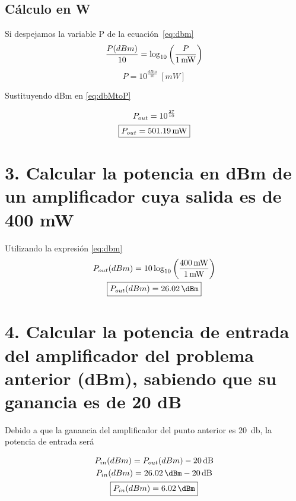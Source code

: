 \documentclass[11pt,a4paper]{article}
\begin{document}
\newpage
\subsection*{Cálculo en W}
Si despejamos la variable P de la ecuación~\eqref{eq:dbm}
\[
        \frac{P(dBm)}{10} = \log_{10} \left(\frac{P}{\SI{1}{\milli\watt}}\right)\\[5mm]
\]
\begin{equation}
    P = 10^{\frac{dBm}{10}}\ [mW]
    \label{eq:dbMtoP}
\end{equation}

Sustituyendo dBm en \eqref{eq:dbMtoP}

\[
    \begin{gathered}
        P_{out} = 10^{\frac{27}{10}} \\
        \boxed{P_{out} = \SI{501{,}19}{\milli\watt}}
    \end{gathered}
\]

\section*{3. Calcular la potencia en dBm de un amplificador cuya salida es de 400 mW}
Utilizando la expresión \eqref{eq:dbm}
\[
    \begin{gathered}
        P_{out}(dBm) = 10 \log_{10} \left(\frac{\SI{400}{\milli\watt}}{\SI{1}{\milli\watt}}\right) \\
        \boxed{P_{out}(dBm) = \SI{26{,}02}{\dBm}}
    \end{gathered}
\]

\section*{4. Calcular la potencia de entrada del amplificador del problema anterior (dBm),
sabiendo que su ganancia es de 20 dB}
Debido a que la ganancia del amplificador del punto anterior es \SI{20}{\decibel}, la
potencia de entrada será

\[
    \begin{gathered}
        P_{in}(dBm) = P_{out}(dBm) - \SI{20}{\decibel} \\
        P_{in}(dBm) = \SI{26{,}02}{\dBm} - \SI{20}{\decibel} \\
        \boxed{P_{in}(dBm) = \SI{6{,}02}{\dBm}}
    \end{gathered}
\]

\end{document}
